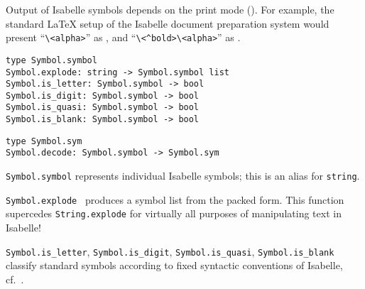 \begin{isabellebody}
\begin{isamarkuptext}
  \medskip Output of Isabelle symbols depends on the print mode
  ().  For example, the standard {\LaTeX} setup of
  the Isabelle document preparation system would present
  ``\verb,\,\verb,<alpha>,'' as \isa{{\isasymalpha}}, and
  ``\verb,\,\verb,<^bold>,\verb,\,\verb,<alpha>,'' as \isa{\isactrlbold {\isasymalpha}}.%
\end{isamarkuptext}%
\isamarkuptrue%
%
\isadelimmlref
%
\endisadelimmlref
%
\isatagmlref
%
\begin{isamarkuptext}%
\begin{mldecls}
  \verb|type Symbol.symbol| \\
  \verb|Symbol.explode: string -> Symbol.symbol list| \\
  \verb|Symbol.is_letter: Symbol.symbol -> bool| \\
  \verb|Symbol.is_digit: Symbol.symbol -> bool| \\
  \verb|Symbol.is_quasi: Symbol.symbol -> bool| \\
  \verb|Symbol.is_blank: Symbol.symbol -> bool| \\
  \end{mldecls}
  \begin{mldecls}
  \verb|type Symbol.sym| \\
  \verb|Symbol.decode: Symbol.symbol -> Symbol.sym| \\
  \end{mldecls}

  \begin{description}

  \item \verb|Symbol.symbol| represents individual Isabelle
  symbols; this is an alias for \verb|string|.

  \item \verb|Symbol.explode|~ produces a symbol list
  from the packed form.  This function supercedes \verb|String.explode| for virtually all purposes of manipulating text in
  Isabelle!

  \item \verb|Symbol.is_letter|, \verb|Symbol.is_digit|, \verb|Symbol.is_quasi|, \verb|Symbol.is_blank| classify standard
  symbols according to fixed syntactic conventions of Isabelle, cf.\
  \cite{isabelle-isar-ref}.


\end{description}
\end{isamarkuptext}
\end{isabellebody}
